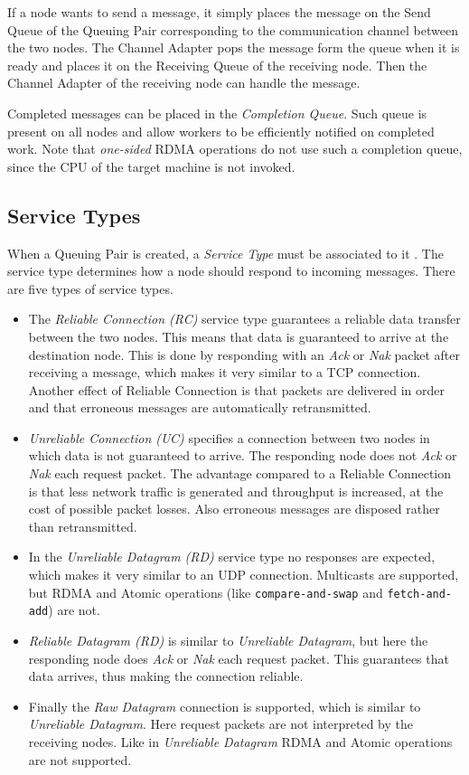If a node wants to send a message, it simply places the message on the Send Queue of the Queuing Pair corresponding to the communication channel between the two nodes. The Channel Adapter pops the message form the queue when it is ready and places it on the Receiving Queue of the receiving node. Then the Channel Adapter of the receiving node can handle the message. 

Completed messages can be placed in the \emph{Completion Queue}. Such queue is present on all nodes and allow workers to be efficiently notified on completed work. Note that \emph{one-sided} RDMA operations do not use such a completion queue, since the CPU of the target machine is not invoked.

\subsection{Service Types}
When a Queuing Pair is created, a \emph{Service Type} must be associated to it \cite{pfister2001introduction}. The service type determines how a node should respond to incoming messages. There are five types of service types.

\begin{itemize}
	\item The \emph{Reliable Connection (RC)} service type guarantees a reliable data transfer between the two nodes. This means that data is guaranteed to arrive at the destination node. This is done by responding with an \emph{Ack} or \emph{Nak} packet after receiving a message, which makes it very similar to a TCP connection. Another effect of Reliable Connection is that packets are delivered in order and that erroneous messages are automatically retransmitted.

	\item \emph{Unreliable Connection (UC)} specifies a connection between two nodes in which data is not guaranteed to arrive. The responding node does not \emph{Ack} or \emph{Nak} each request packet. The advantage compared to a Reliable Connection is that less network traffic is generated and throughput is increased, at the cost of possible packet losses. Also erroneous messages are disposed rather than retransmitted.

	\item In the \emph{Unreliable Datagram (RD)} service type no responses are expected, which makes it very similar to an UDP connection. Multicasts are supported, but RDMA and Atomic operations (like \texttt{compare-and-swap} and \texttt{fetch-and-add}) are not.

	\item \emph{Reliable Datagram (RD)} is similar to \emph{Unreliable Datagram}, but here the responding node does \emph{Ack} or \emph{Nak} each request packet. This guarantees that data arrives, thus making the connection reliable.

	\item Finally the \emph{Raw Datagram} connection is supported, which is similar to \emph{Unreliable Datagram}. Here request packets are not interpreted by the receiving nodes. Like in \emph{Unreliable Datagram} RDMA and Atomic operations are not supported. 
\end{itemize}

